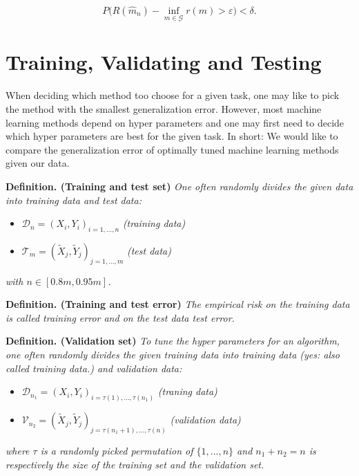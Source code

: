 \documentclass[
]{book}
\providecommand{\tightlist}{%
  \setlength{\itemsep}{0pt}\setlength{\parskip}{0pt}}
\begin{document}
\[
P\Big(R(\hat{m}_n)-\inf_{m\in\mathcal{G}}r(m)>\varepsilon\Big)<\delta.
\]

\hypertarget{training-validating-and-testing}{%
\section{Training, Validating and Testing}\label{training-validating-and-testing}}

When deciding which method too choose for a given task, one may like to pick the method with the smallest generalization error. However, most machine learning methods depend on hyper parameters and one may first need to decide which hyper parameters are best for the given task. In short: We would like to compare the generalization error of optimally tuned machine learning methods given our data.

\textbf{Definition. (Training and test set)} \emph{One often randomly divides the given data into training data and test data:}

\begin{itemize}
\tightlist
\item
  \(\mathcal{D}_n=(X_i,Y_i)_{i=1,...,n}\) \emph{(training data)}
\item
  \(\mathcal{T}_m=(\tilde{X}_j,\tilde{Y}_j)_{j=1,...,m}\) \emph{(test data)}
\end{itemize}

\emph{with \(n\in[0.8m,0.95m]\).}

\textbf{Definition. (Training and test error)} \emph{The empirical risk on the training data is called training error and on the test data test error.}

\textbf{Definition. (Validation set)} \emph{To tune the hyper parameters for an algorithm, one often randomly divides the given training data into training data (yes: also called training data.) and validation data:}

\begin{itemize}
\tightlist
\item
  \(\mathcal{D}_{n_1}=(X_i,Y_i)_{i=\tau(1),...,\tau(n_1)}\) \emph{(traning data)}
\item
  \(\mathcal{V}_{n_2}=(\tilde{X}_j,\tilde{Y}_j)_{j=\tau(n_1+1),...,\tau(n)}\) \emph{(validation data)}
\end{itemize}

\emph{where \(\tau\) is a randomly picked permutation of \(\{1,...,n\}\) and \(n_1+n_2=n\) is respectively the size of the training set and the validation set.}
\end{document}
